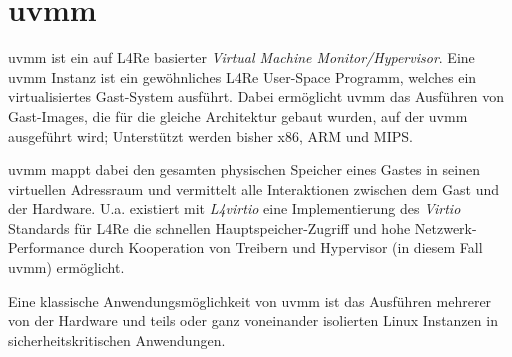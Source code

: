 \section{uvmm}
\label{sec:uvmm}

uvmm ist ein auf L4Re basierter \textit{Virtual Machine Monitor/Hypervisor}.
Eine uvmm Instanz ist ein gewöhnliches L4Re User-Space Programm, welches ein
virtualisiertes Gast-System ausführt. Dabei ermöglicht uvmm das Ausführen von
Gast-Images, die für die gleiche Architektur gebaut wurden, auf der uvmm
ausgeführt wird; Unterstützt werden bisher x86, ARM und MIPS.

uvmm mappt dabei den gesamten physischen Speicher eines Gastes in seinen
virtuellen Adressraum und vermittelt alle Interaktionen zwischen dem Gast und
der Hardware. U.a. existiert mit \textit{L4virtio} eine Implementierung des
\textit{Virtio} Standards für L4Re die schnellen Hauptspeicher-Zugriff und hohe
Netzwerk-Performance durch Kooperation von Treibern und Hypervisor (in diesem
Fall uvmm) ermöglicht.

Eine klassische Anwendungsmöglichkeit von uvmm ist das Ausführen mehrerer
von der Hardware und teils oder ganz voneinander isolierten Linux Instanzen in
sicherheitskritischen Anwendungen.
